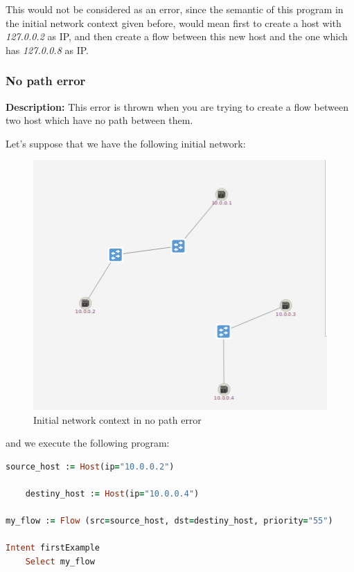 This would not be considered as an error, since the semantic of this program in the initial network context given before, would mean first to create a host with \textit{127.0.0.2} as IP, and then create a flow between this new host and the one which has \textit{127.0.0.8} as IP.

\subsubsection{No path error}

\textbf{Description:} This error is thrown when you are trying to create a flow between two host which have no path between them.

Let's suppose that we have the following initial network:

\begin{figure}[H]
\centering
\includegraphics[width=\textwidth]{images/haikunet/error_scenario_2.png}
\caption{Initial network context in no path error}
\end{figure}

and we execute the following program:

\begin{lstlisting}[language=Ruby,breaklines=true]
source_host := Host(ip="10.0.0.2")

    destiny_host := Host(ip="10.0.0.4")

my_flow := Flow (src=source_host, dst=destiny_host, priority="55")

Intent firstExample
    Select my_flow
\end{lstlisting}

